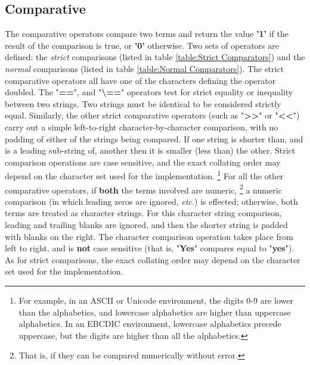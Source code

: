 \subsection{Comparative}\label{refcomps}
The comparative operators compare two terms and return the
value \textbf{'1'} if the result of the comparison is true,
or \textbf{'0'} otherwise.  Two sets of operators are defined: the
\emph{strict} comparisons (listed in table \ref{table:Strict
  Comparators}) and the \emph{normal} comparisons (listed in table
\ref{table:Normal Comparators}).
 The strict comparative operators all have one of the characters
defining the operator doubled.  The "\textbf{==}",
and "\textbf{\textbackslash ==}" operators
test for strict equality or inequality between two strings.
Two strings must be identical to be considered strictly equal.
Similarly, the other strict comparative operators (such as
"\textbf{>>}" or "\textbf{<<}") carry out a simple
left-to-right character-by-character comparison, with no padding of
either of the strings being compared.
If one string is shorter than, and is a leading sub-string of, another
then it is smaller (less than) the other.
Strict comparison operations are case sensitive, and the exact collating
order may depend on the character set used for the implementation.
\footnote{
For example, in an ASCII or Unicode environment, the digits 0-9
are lower than the alphabetics, and lowercase alphabetics are higher
than uppercase alphabetics.
In an EBCDIC environment, lowercase alphabetics precede uppercase, but
the digits are higher than all the alphabetics.
}
 For all the other comparative operators, if \textbf{both} the
terms involved are numeric,
\footnote{
That is, if they can be compared numerically without error.
}
a numeric comparison (in which leading zeros are ignored,
\emph{etc.}) is effected; otherwise, both terms are treated as character
strings.
For this character string comparison, leading and trailing blanks are
ignored, and then the shorter string is padded with blanks on the right.
The character comparison operation takes place from left to right, and
is \textbf{not} case sensitive (that is, "\textbf{Yes}"
compares equal to "\textbf{yes}").
As for strict comparisons, the exact collating order may depend on the
character set used for the implementation.

